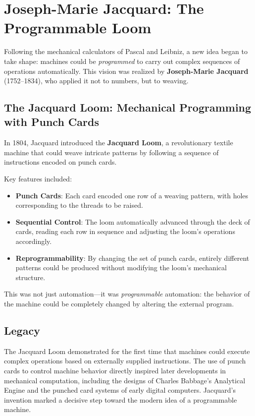 \section{Joseph-Marie Jacquard: The Programmable Loom}

Following the mechanical calculators of Pascal and Leibniz, a new idea began to take shape: machines could be \textit{programmed} to carry out complex sequences of operations automatically. This vision was realized by \textbf{Joseph-Marie Jacquard} (1752--1834), who applied it not to numbers, but to weaving.

\subsection{The Jacquard Loom: Mechanical Programming with Punch Cards}

In 1804, Jacquard introduced the \textbf{Jacquard Loom}, a revolutionary textile machine that could weave intricate patterns by following a sequence of instructions encoded on punch cards.

Key features included:

\begin{itemize}
    \item \textbf{Punch Cards}: Each card encoded one row of a weaving pattern, with holes corresponding to the threads to be raised.
    \item \textbf{Sequential Control}: The loom automatically advanced through the deck of cards, reading each row in sequence and adjusting the loom's operations accordingly.
    \item \textbf{Reprogrammability}: By changing the set of punch cards, entirely different patterns could be produced without modifying the loom's mechanical structure.
\end{itemize}

This was not just automation---it was \textit{programmable} automation: the behavior of the machine could be completely changed by altering the external program.

\subsection{Legacy}

The Jacquard Loom demonstrated for the first time that machines could execute complex operations based on externally supplied instructions. The use of punch cards to control machine behavior directly inspired later developments in mechanical computation, including the designs of Charles Babbage’s Analytical Engine and the punched card systems of early digital computers. Jacquard’s invention marked a decisive step toward the modern idea of a programmable machine.

